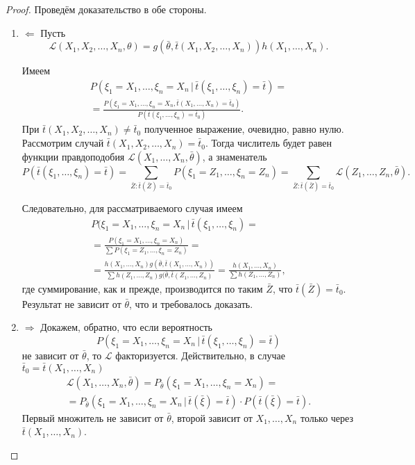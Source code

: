 \begin{proof}
	Проведём доказательство в обе стороны.
	\begin{enumerate}
		\item $\boxed{\Leftarrow}$ Пусть
			\[
				\mathscr L(X_1, X_2, \ldots, X_n, \theta) = g\left(\bar \theta, \bar t(X_1,
				X_2, \ldots, X_n) \right)h(X_1, \ldots, X_n).
			\]

			Имеем
  \begin{multline*}
    P(\xi_1 = X_1, \dots, \xi_n = X_n \, | \, \bar t (\xi_1, \dots, \xi_n) = \bar t)
    = \\ = \frac{P(\xi_1=X_1, \dots, \xi_n = X_n, \bar t(X_1, \dots, X_n) = \bar
		t_0)}{P(\bar t(\xi_1, \dots, \xi_n) = \bar t_0)}.
  \end{multline*}
При $ \bar t(X_1, X_2, \ldots, X_n) \neq \bar t_0$ полученное выражение,
очевидно, равно нулю. Рассмотрим случай $ \bar t(X_1, X_2, \ldots, X_n) = \bar
t_0 $. Тогда числитель будет равен функции правдоподобия $ \mathscr L(X_1,
\ldots , X_n, \bar \theta) $, а знаменатель 
\[
		P(\bar t(\xi_1, \ldots, \xi_n) = \bar t) = \sum_{\bar Z \colon \bar t(\bar
		Z) = \bar t_0} P(\xi_1 = Z_1, \ldots, \xi_n = Z_n) = \sum_{\bar Z\colon \bar
		t(\bar Z) = \bar t_0}\mathscr L(Z_1, \ldots, Z_n, \bar \theta). 
\]

Следовательно, для рассматриваемого случая имеем
\begin{multline*}
    P(\xi_1 = X_1, \dots, \xi_n = X_n \, | \, \bar t (\xi_1, \dots, \xi_n) =\\=
		\frac{P(\xi_1 = X_1, \ldots, \xi_n = X_n)}{\sum P(\xi_1 = Z_1, \ldots, \xi_n = Z_n)} =\\= \frac{h(X_1, \dots, X_n)
		g(\bar \theta, \bar t(X_1, \dots, X_n))}{\sum h(Z_1, \dots, Z_n)
		g(\bar\theta, \bar t(Z_1, \dots, Z_n)} = \frac{h(X_1, \dots, X_n)}{\sum h(Z_1,
		\dots, Z_n)},
\end{multline*}
где суммирование, как и прежде, производится по таким $ \bar Z $, что $ \bar
t(\bar Z) = \bar t_0 $. Результат не зависит от $ \bar \theta $, что и
требовалось доказать.
\item $\boxed{\Rightarrow}$
  Докажем, обратно, что если вероятность
	\[
		P(\xi_1 = X_1, \dots, \xi_n = X_n \,| \,\bar
		t(\xi_1, \dots, \xi_n)
		= \bar t)
	\]
	не зависит от $\bar \theta$, то $\mathscr{L}$ факторизуется. Действительно, в
	случае $ \bar t_0 = \bar t(X_1, \ldots, X_n) $
  \begin{multline*}
    \mathscr{L} (X_1, \dots, X_n, \bar\theta) = P_{\bar\theta} (\xi_1 = X_1,
		\dots, \xi_n = X_n) =\\= P_{\bar\theta} (\xi_1 = X_1, \dots, \xi_n = X_n \,
		|\, \bar
		t(\bar\xi) = \bar t) \cdot P(\bar t(\bar\xi) = \bar t).
  \end{multline*}
  Первый множитель не зависит от $\bar\theta$, второй зависит от $X_1, \dots,
	X_n$ только через $\bar t(X_1, \dots, X_n)$.
\end{enumerate}
\end{proof}

